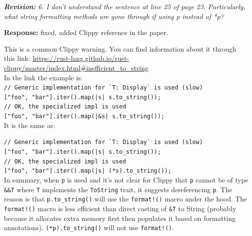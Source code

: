 \documentclass{article}
\begin{document}
\textit{\textbf{Revision:} 6. I don't understand the sentence at line 25 of page 23. Particularly, what string formatting methods are gone through if using p instead of *p?}

\textbf{Response:} fixed, added Clippy reference in the paper. 

This is a common Clippy warning. You can find information about it through this link: \url{https://rust-lang.github.io/rust-clippy/master/index.html#inefficient_to_string} \\

In the link the example is: \\

\noindent\verb+// Generic implementation for `T: Display` is used (slow)+ \\
\verb+["foo", "bar"].iter().map(|s| s.to_string());+\\

\noindent\verb+// OK, the specialized impl is used+\\
\verb+["foo", "bar"].iter().map(|&s| s.to_string());+\\

It is the same as:

\noindent\verb+// Generic implementation for `T: Display` is used (slow)+\\
\verb+["foo", "bar"].iter().map(|s| s.to_string());+\\

\noindent\verb+// OK, the specialized impl is used+\\
\verb+["foo", "bar"].iter().map(|s| (*s).to_string());+\\

In summary, when \verb+p+ is used and it's not clear for Clippy that \verb+p+ cannot be of type \verb+&&T+ where \verb+T+ implements the \verb+ToString+ trait, it suggests dereferencing \verb+p+. The reason is that \verb+p.to_string()+ will use the \verb+format!()+ macro under the hood. The \verb+format!()+ macro is less efficient than direct casting of \verb+&T+ to String (probably because it allocates extra memory first then populates it based on formatting annotations). \verb+(*p).to_string()+ will not use \verb+format!()+.



\small


\end{document}

